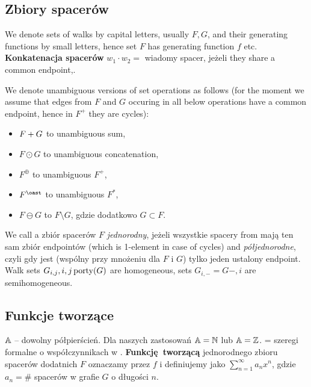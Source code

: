 \subsection{Zbiory spacerów}
We denote sets of walks by capital letters, usually $F, G$, and their generating functions by small letters, hence set $F$ has generating function $f$ etc.
\\
\textbf{Konkatenacja spacerów} $w_1 \cdot w_2 = $ wiadomy spacer, jeżeli they share a common endpoint,.
\begin{df}
	We denote unambiguous versions of set operations as follows (for the moment we assume that edges from $F$ and $G$ occuring in all below operations have a common endpoint, hence in $F^{+}$ they are cycles):
	\begin{itemize}
		\item $F + G $ to unambiguous sum,
		\item $F \odot G$ to unambiguous concatenation,
		\item $F^\oplus $ to unambiguous $F^+$,
		\item $F^\oast $ to unambiguous $F^*$,
		\item $F\ominus G$ to $F\setminus G$, gdzie dodatkowo $G\subset F$. 
	\end{itemize}
\end{df}
	We call a zbiór spacerów $F$ \emph{jednorodny}, jeżeli wszystkie spacery from mają ten sam zbiór endpointów (which is 1-element in case of cycles) and \emph{półjednorodne},  czyli gdy jest (wspólny przy mnożeniu dla $F$ i $G$) tylko jeden ustalony endpoint.
	Walk sets $G_{i,j}, i,j\operatorname{porty}(G)$ are homogeneous, sets $G_{i, -} = G{-, i}$ are semihomogeneous.
%
\subsection{Funkcje tworzące}
$\mathbb{A}$ -- dowolny półpierścień. Dla naszych zastosowań $\mathbb{A} = \mathbb{N} $ lub $\mathbb{A} = \mathbb{Z}$. 	\Ax = szeregi formalne o współczynnikach w \A.
\textbf{Funkcję tworzącą} jednorodnego zbioru spacerów dodatnich $F$ oznaczamy przez $f$ i definiujemy jako $\sum_{n=1}^{\infty} a_n x^n$, gdzie $a_n = \#$ spacerów w grafie $G$ o długości $n$.



